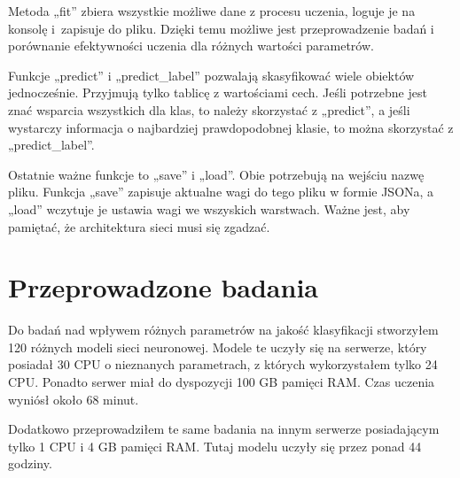     Metoda „fit” zbiera wszystkie możliwe dane z procesu uczenia, loguje je na konsolę i~zapisuje do pliku.
    Dzięki temu możliwe jest przeprowadzenie badań i porównanie efektywności uczenia dla różnych wartości parametrów.

    Funkcje „predict” i „predict\_label” pozwalają skasyfikować wiele obiektów jednocześnie.
    Przyjmują tylko tablicę z wartościami cech.
    Jeśli potrzebne jest znać wsparcia wszystkich dla klas, to należy skorzystać z „predict”, a jeśli wystarczy informacja o najbardziej prawdopodobnej klasie, to można skorzystać z „predict\_label”.

    Ostatnie ważne funkcje to „save” i „load”.
    Obie potrzebują na wejściu nazwę pliku.
    Funkcja „save” zapisuje aktualne wagi do tego pliku w formie JSONa, a „load” wczytuje je ustawia wagi we wszyskich warstwach.
    Ważne jest, aby pamiętać, że architektura sieci musi się zgadzać.

    \chapter{Przeprowadzone badania}\label{ch:przeprowadzoneBadania}

    Do badań nad wpływem różnych parametrów na jakość klasyfikacji stworzyłem 120 różnych modeli sieci neuronowej.
    Modele te uczyły się na serwerze, który posiadał 30 CPU o nieznanych parametrach, z których wykorzystałem tylko 24 CPU.
    Ponadto serwer miał do dyspozycji 100 GB pamięci RAM.
    Czas uczenia wyniósł około 68 minut.

    Dodatkowo przeprowadziłem te same badania na innym serwerze posiadającym tylko 1 CPU i 4 GB pamięci RAM.
    Tutaj modelu uczyły się przez ponad 44 godziny.

